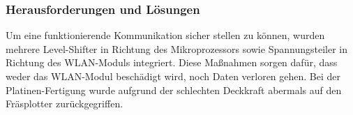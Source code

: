     \subsubsection{Herausforderungen und Lösungen}
    Um eine funktionierende Kommunikation sicher stellen zu können, wurden mehrere Level-Shifter in Richtung des Mikroprozessors sowie Spannungsteiler in Richtung des WLAN-Moduls
    integriert. Diese Maßnahmen sorgen dafür, dass weder das WLAN-Modul beschädigt wird, noch Daten verloren gehen.
    Bei der Platinen-Fertigung wurde aufgrund der schlechten Deckkraft abermals auf den Fräsplotter zurückgegriffen.

